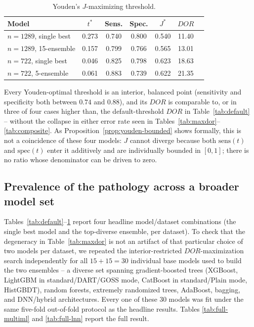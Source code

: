 \documentclass[11pt]{article}
\begin{document}
\begin{table}[ht]
\centering
\caption{Youden's $J$-maximizing threshold.}
\label{tab:youden}
\begin{tabular}{lcccccc}
\toprule
Model & $t^\ast$ & Sens. & Spec. & $J^\ast$ & $DOR$ \\
\midrule
$n{=}1289$, single best   & 0.273 & 0.740 & 0.800 & 0.540 & 11.40 \\
$n{=}1289$, 15-ensemble   & 0.157 & 0.799 & 0.766 & 0.565 & 13.01 \\
$n{=}722$, single best    & 0.046 & 0.825 & 0.798 & 0.623 & 18.63 \\
$n{=}722$, 5-ensemble     & 0.061 & 0.883 & 0.739 & 0.622 & 21.35 \\
\bottomrule
\end{tabular}
\end{table}

Every Youden-optimal threshold is an interior, balanced point (sensitivity
and specificity both between $0.74$ and $0.88$), and its $DOR$ is
comparable to, or in three of four cases higher than, the default-threshold
$DOR$ in Table~\ref{tab:default} -- without the collapse in either error
rate seen in Tables~\ref{tab:maxdor}--\ref{tab:composite}. As
Proposition~\ref{prop:youden-bounded} shows formally, this is not a
coincidence of these four models: $J$ cannot diverge because both
$\mathrm{sens}(t)$ and $\mathrm{spec}(t)$ enter it additively and are
individually bounded in $[0,1]$; there is no ratio whose denominator can be
driven to zero.

\subsection{Prevalence of the pathology across a broader model set}
\label{sec:prevalence}

Tables~\ref{tab:default}--\ref{tab:youden} report four headline
model/dataset combinations (the single best model and the top-diverse
ensemble, per dataset). To check that the degeneracy in Table~\ref{tab:maxdor}
is not an artifact of that particular choice of two models per dataset, we
repeated the interior-restricted $DOR$-maximization search independently
for all $15+15=30$ individual base models used to build the two ensembles
-- a diverse set spanning gradient-boosted trees (XGBoost, LightGBM in
standard/DART/GOSS mode, CatBoost in standard/Plain mode, HistGBDT),
random forests, extremely randomized trees, AdaBoost, bagging, and
DNN/hybrid architectures. Every one of these 30 models was fit under the
same five-fold out-of-fold protocol as the headline results. Tables
\ref{tab:full-multiml} and \ref{tab:full-lnn} report the full result.
\end{document}
